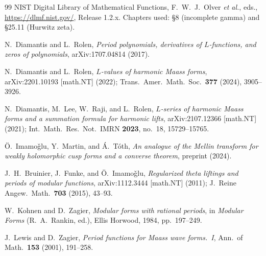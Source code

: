 \documentclass[11pt]{article}
\numberwithin{equation}{section}  %
\begin{document}
\begin{thebibliography}{99}
NIST Digital Library of Mathematical Functions,
F.~W.~J.\ Olver \emph{et al.}, eds.,
\url{https://dlmf.nist.gov/}, Release 1.2.x.
Chapters used: \S8 (incomplete gamma) and \S25.11 (Hurwitz zeta).

N.\ Diamantis and L.\ Rolen,
\emph{Period polynomials, derivatives of $L$-functions, and zeros of polynomials},
arXiv:1707.04814 (2017).

N.\ Diamantis and L.\ Rolen,
\emph{$L$-values of harmonic Maass forms},
arXiv:2201.10193 [math.NT] (2022); Trans.\ Amer.\ Math.\ Soc.\ \textbf{377} (2024), 3905--3926.

N.\ Diamantis, M.\ Lee, W.\ Raji, and L.\ Rolen,
\emph{$L$-series of harmonic Maass forms and a summation formula for harmonic lifts},
arXiv:2107.12366 [math.NT] (2021); Int.\ Math.\ Res.\ Not.\ IMRN \textbf{2023}, no.~18, 15729--15765.

\"O.\ Imamo\v{g}lu, Y.\ Martin, and \'A.\ T\'oth,
\emph{An analogue of the Mellin transform for weakly holomorphic cusp forms and a converse theorem},
preprint (2024).

J.~H.\ Bruinier, J.\ Funke, and \"O.\ Imamo\v{g}lu,
\emph{Regularized theta liftings and periods of modular functions},
arXiv:1112.3444 [math.NT] (2011); J.\ Reine Angew.\ Math.\ \textbf{703} (2015), 43--93.


W.\ Kohnen and D.\ Zagier,
\emph{Modular forms with rational periods},
in \emph{Modular Forms} (R.~A.\ Rankin, ed.), Ellis Horwood, 1984, pp.\ 197--249.

J.\ Lewis and D.\ Zagier,
\emph{Period functions for Maass wave forms.\ I},
Ann.\ of Math.\ \textbf{153} (2001), 191--258.

\end{thebibliography}
\end{document}

